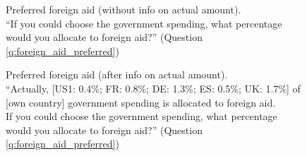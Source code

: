 \begin{figure}[h!]
    \caption[Preferred foreign aid (without info on actual amount)]{Preferred foreign aid (without info on actual amount). \\ ``If you could choose the government spending, what percentage would you allocate
    to foreign aid?'' (Question \ref{q:foreign_aid_preferred})}\label{fig:foreign_aid_preferred_no_info}
\end{figure}

\begin{figure}[h!]
    \caption[Preferred foreign aid (after info on actual amount)]{Preferred foreign aid (after info on actual amount). \\ ``Actually,
    [US1: 0.4\%; FR: 0.8\%; DE: 1.3\%; ES: 0.5\%; UK: 1.7\%] of [own country] government spending is allocated to foreign aid. \\
    If you could choose the government spending, what percentage would you allocate
    to foreign aid?'' (Question \ref{q:foreign_aid_preferred})}\label{fig:foreign_aid_preferred_info}
\end{figure}

